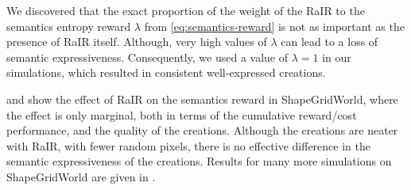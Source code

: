 We discovered that the exact proportion of the weight of the RaIR to the semantics entropy reward \(\lambda\) from \eqref{eq:semantics-reward} is not as important as the presence of RaIR itself.
Although, very high values of \(\lambda\) can lead to a loss of semantic expressiveness.
Consequently, we used a value of \(\lambda = 1\) in our simulations, which resulted in consistent well-expressed creations.

 and  show the effect of RaIR on the semantics reward in ShapeGridWorld, where the effect is only marginal, both in terms of the cumulative reward/cost performance, and the quality of the creations.
Although the creations are neater with RaIR, with fewer random pixels, there is no effective difference in the semantic expressiveness of the creations.
Results for many more simulations on ShapeGridWorld are given in .

